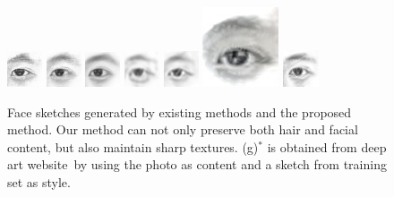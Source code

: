 \documentclass[10pt,twocolumn,letterpaper]{article}
\begin{document}
\begin{figure}[t]
\begin{minipage}[t]{1\linewidth}
\includegraphics[width=0.11\linewidth]{img/page1_example/eye_mrf.png}
\includegraphics[width=0.11\linewidth]{img/page1_example/eye_wmrf.png}
\includegraphics[width=0.11\linewidth]{img/page1_example/eye_ssd.png}
\includegraphics[width=0.11\linewidth]{img/page1_example/eye_fcnn.png}
\includegraphics[width=0.11\linewidth]{img/page1_example/eye_bfcn.png}
\includegraphics[width=0.11\linewidth]{img/page1_example/eye_deepart.jpg}
\includegraphics[width=0.11\linewidth]{img/page1_example/eye_ours1.png}
\end{minipage}
\caption[Caption for LOF]{Face sketches generated by existing methods and the proposed method. Our method can not only preserve both hair and facial content, but also maintain sharp textures. \setcounter{footnote}{0} (g)$^*$ is obtained from deep art website\footnotemark~by using the photo as content and a sketch from training set as style.}
\label{fig:example_comp}
\end{figure}
\end{document}
